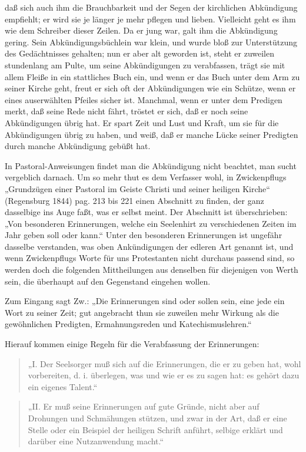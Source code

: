 daß sich auch ihm die Brauchbarkeit und der Segen der kirchlichen Abkündigung empfiehlt; er wird sie je länger je mehr pflegen und lieben. Vielleicht geht es ihm wie dem Schreiber dieser Zeilen. Da er jung war, galt ihm die Abkündigung gering. Sein Abkündigungsbüchlein war klein, und wurde bloß zur Unterstützung des Gedächtnisses gehalten; nun er aber alt geworden ist, steht er zuweilen stundenlang am Pulte, um seine Abkündigungen zu verabfassen, trägt sie mit allem Fleiße in ein stattliches Buch ein, und wenn er das Buch unter dem Arm zu seiner Kirche geht, freut er sich oft der Abkündigungen wie ein Schütze, wenn er eines auserwählten Pfeiles sicher ist. Manchmal, wenn er unter dem Predigen merkt, daß seine Rede nicht fährt, tröstet er sich, daß er noch seine Abkündigungen übrig hat. Er spart Zeit und Lust und Kraft, um sie für die Abkündigungen übrig zu haben, und weiß, daß er manche Lücke seiner Predigten durch manche Abkündigung gebüßt hat.

In Pastoral-Anweisungen findet man die Abkündigung nicht beachtet, man sucht vergeblich darnach. Um so mehr thut es dem Verfasser wohl, in Zwickenpflugs „Grundzügen einer Pastoral im Geiste Christi und seiner heiligen Kirche“ (Regensburg 1844) pag. 213 bis 221 einen Abschnitt zu finden, der ganz dasselbige ins Auge faßt, was er selbst meint. Der Abschnitt ist überschrieben: „Von besonderen Erinnerungen, welche ein Seelenhirt zu verschiedenen Zeiten im Jahr geben soll oder kann.“ Unter den besonderen Erinnerungen ist ungefähr dasselbe verstanden, was oben Ankündigungen der edleren
Art genannt ist, und wenn Zwickenpflugs Worte für uns Protestanten nicht durchaus passend sind, so werden doch die folgenden Mittheilungen aus denselben für diejenigen von Werth sein, die überhaupt auf den Gegenstand eingehen wollen.

Zum Eingang sagt Zw.: „Die Erinnerungen sind oder sollen sein, eine jede ein Wort zu seiner Zeit; gut angebracht thun sie zuweilen mehr Wirkung als die gewöhnlichen Predigten, Ermahnungsreden und Katechismuslehren.“

Hierauf kommen einige Regeln für die Verabfassung der Erinnerungen:

\begin{quote}
„I. Der Seelsorger muß sich auf die Erinnerungen, die er zu geben hat, wohl vorbereiten, d. i. überlegen, was und wie er es zu sagen hat: es gehört dazu ein eigenes Talent.“
\end{quote}

\begin{quote}
„II. Er muß seine Erinnerungen auf gute Gründe, nicht aber auf Drohungen und Schmähungen stützen, und zwar in der Art, daß er eine Stelle oder ein Beispiel der heiligen Schrift anführt, selbige erklärt und darüber eine Nutzanwendung macht.“
\end{quote}

